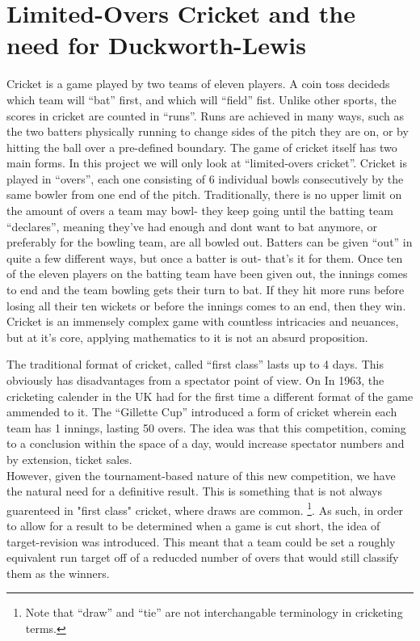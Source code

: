 \section{Limited-Overs Cricket and the need for Duckworth-Lewis}
Cricket is a game played by two teams of eleven players. A coin toss decideds which team will ``bat'' first, and which will ``field'' fist. Unlike other sports, the scores in cricket are counted in ``runs''. Runs are achieved
in many ways, such as the two batters physically running to change sides of the pitch they are on, or by hitting the ball over a pre-defined boundary. The game of cricket itself has two main forms. In this project we will 
only look at ``limited-overs cricket''. Cricket is played in ``overs'', each one consisting of 6 individual bowls consecutively by the same bowler from one end of the pitch. Traditionally, there is no upper limit on the 
amount of overs a team may bowl- they keep going until the batting team ``declares'', meaning they've had enough and dont want to bat anymore, or preferably for the bowling team, are all bowled out. 
Batters can be given ``out'' in quite a few different ways, but once a batter is out- that's it for them. Once ten of the eleven players on the batting team have been given out, the innings comes to end and the team bowling 
gets their turn to bat. If they hit more runs before losing all their ten wickets or before the innings comes to an end, then they win. Cricket is an immensely complex game with countless intricacies and neuances, but at 
it's core, applying mathematics to it is not an absurd proposition. 

The traditional format of cricket, called ``first class'' lasts up to 4 days. This obviously has disadvantages from a spectator point of view. On
In 1963, the cricketing calender in the UK had for the first time a different format of the game ammended to it.
The ``Gillette Cup'' introduced a form of cricket wherein each team has 1 innings, lasting 50 overs. The idea was 
that this competition, coming to a conclusion within the space of a day, would increase spectator numbers and by extension,
ticket sales.\\

However, given the tournament-based nature of this new competition, we have the natural need for a definitive result.
This is something that is not always guarenteed in "first class" cricket, where draws are common. \footnote{Note that 
``draw'' and ``tie'' are not interchangable terminology in cricketing terms.}. As such, in order to allow for a result to be
determined when a game is cut short, the idea of target-revision was introduced. This meant that a team could be set a
roughly equivalent run target off of a reducded number of overs that would still classify them as the winners.

